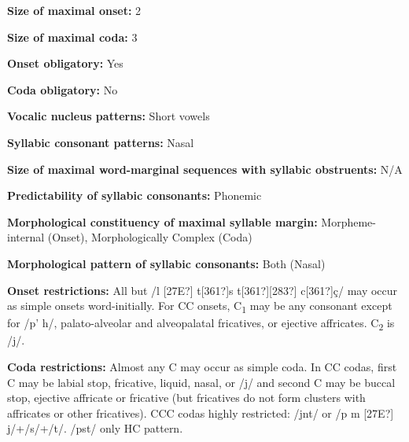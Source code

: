\begin{styleBody}
\textbf{Size of maximal onset:} 2
\end{styleBody}

\begin{styleBody}
\textbf{Size of maximal coda: }3
\end{styleBody}

\begin{styleBody}
\textbf{Onset obligatory:} Yes
\end{styleBody}

\begin{styleBody}
\textbf{Coda obligatory:} No
\end{styleBody}

\begin{styleBody}
\textbf{Vocalic nucleus patterns: }Short vowels
\end{styleBody}

\begin{styleBody}
\textbf{Syllabic consonant patterns:} Nasal
\end{styleBody}

\begin{styleBody}
\textbf{Size of maximal word{}-marginal sequences with syllabic obstruents:} N/A
\end{styleBody}

\begin{styleBody}
\textbf{Predictability of syllabic consonants:} Phonemic
\end{styleBody}

\begin{styleBody}
\textbf{Morphological constituency of maximal syllable margin:} Morpheme-internal (Onset), Morphologically Complex (Coda)
\end{styleBody}

\begin{styleBody}
\textbf{Morphological pattern of syllabic consonants:} Both (Nasal)
\end{styleBody}

\begin{styleBody}
\textbf{Onset restrictions:} All but /l [27E?] t[361?]s t[361?][283?] c[361?]ç/ may occur as simple onsets word-initially. For CC onsets, C\textsubscript{1} may be any consonant except for /p’ h/, palato-alveolar and alveopalatal fricatives, or ejective affricates. C\textsubscript{2} is /j/.
\end{styleBody}

\begin{styleBody}
\textbf{Coda restrictions:} Almost any C may occur as simple coda. In CC codas, first C may be labial stop, fricative, liquid, nasal, or /j/ and second C may be buccal stop, ejective affricate or fricative (but fricatives do not form clusters with affricates or other fricatives). CCC codas highly restricted: /jnt/ or /p m [27E?] j/+/s/+/t/. /pst/ only HC pattern.
\end{styleBody}

